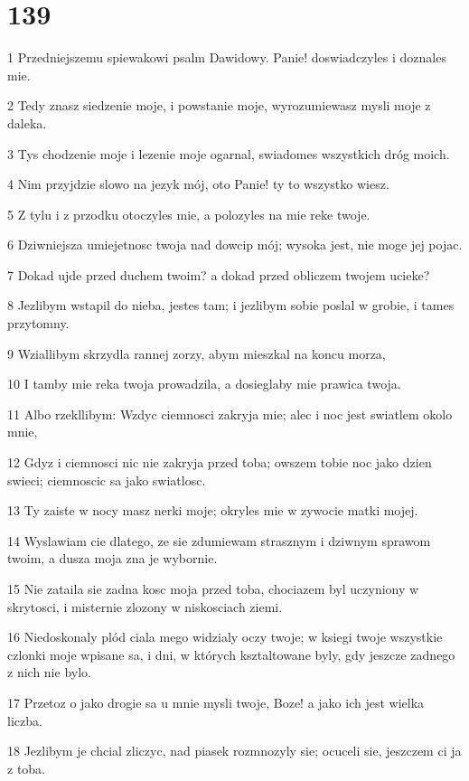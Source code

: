 \chapter{139}

\par 1 Przedniejszemu spiewakowi psalm Dawidowy. Panie! doswiadczyles i doznales mie.
\par 2 Tedy znasz siedzenie moje, i powstanie moje, wyrozumiewasz mysli moje z daleka.
\par 3 Tys chodzenie moje i lezenie moje ogarnal, swiadomes wszystkich dróg moich.
\par 4 Nim przyjdzie slowo na jezyk mój, oto Panie! ty to wszystko wiesz.
\par 5 Z tylu i z przodku otoczyles mie, a polozyles na mie reke twoje.
\par 6 Dziwniejsza umiejetnosc twoja nad dowcip mój; wysoka jest, nie moge jej pojac.
\par 7 Dokad ujde przed duchem twoim? a dokad przed obliczem twojem ucieke?
\par 8 Jezlibym wstapil do nieba, jestes tam; i jezlibym sobie poslal w grobie, i tames przytomny.
\par 9 Wziallibym skrzydla rannej zorzy, abym mieszkal na koncu morza,
\par 10 I tamby mie reka twoja prowadzila, a dosieglaby mie prawica twoja.
\par 11 Albo rzekllibym: Wzdyc ciemnosci zakryja mie; alec i noc jest swiatlem okolo mnie,
\par 12 Gdyz i ciemnosci nic nie zakryja przed toba; owszem tobie noc jako dzien swieci; ciemnoscic sa jako swiatlosc.
\par 13 Ty zaiste w nocy masz nerki moje; okryles mie w zywocie matki mojej.
\par 14 Wyslawiam cie dlatego, ze sie zdumiewam strasznym i dziwnym sprawom twoim, a dusza moja zna je wybornie.
\par 15 Nie zataila sie zadna kosc moja przed toba, chociazem byl uczyniony w skrytosci, i misternie zlozony w niskosciach ziemi.
\par 16 Niedoskonaly plód ciala mego widzialy oczy twoje; w ksiegi twoje wszystkie czlonki moje wpisane sa, i dni, w których ksztaltowane byly, gdy jeszcze zadnego z nich nie bylo.
\par 17 Przetoz o jako drogie sa u mnie mysli twoje, Boze! a jako ich jest wielka liczba.
\par 18 Jezlibym je chcial zliczyc, nad piasek rozmnozyly sie; ocuceli sie, jeszczem ci ja z toba.
